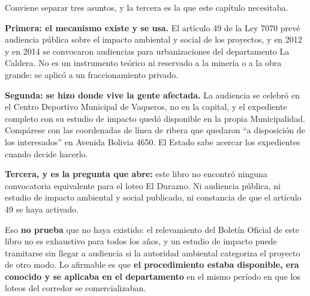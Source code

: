 \begin{cautela}
Conviene separar tres asuntos, y la tercera es la que este capítulo necesitaba.

\textbf{Primera: el mecanismo existe y se usa.} El artículo 49 de la Ley 7070 prevé audiencia pública sobre el impacto ambiental y social de los proyectos, y en 2012 y en 2014 se convocaron audiencias para urbanizaciones del departamento La Caldera. No es un instrumento teórico ni reservado a la minería o a la obra grande: se aplicó a un fraccionamiento privado.

\textbf{Segunda: se hizo donde vive la gente afectada.} La audiencia se celebró en el Centro Deportivo Municipal de Vaqueros, no en la capital, y el expediente completo con su estudio de impacto quedó disponible en la propia Municipalidad. Compárese con las coordenadas de línea de ribera que quedaron ``a disposición de los interesados'' en Avenida Bolivia 4650. El Estado sabe acercar los expedientes cuando decide hacerlo.

\textbf{Tercera, y es la pregunta que abre:} este libro no encontró ninguna convocatoria equivalente para el loteo El Durazno. Ni audiencia pública, ni estudio de impacto ambiental y social publicado, ni constancia de que el artículo 49 se haya activado.

Eso \textbf{no prueba} que no haya existido: el relevamiento del Boletín Oficial de este libro no es exhaustivo para todos los años, y un estudio de impacto puede tramitarse sin llegar a audiencia si la autoridad ambiental categoriza el proyecto de otro modo. Lo afirmable es que \textbf{el procedimiento estaba disponible, era conocido y se aplicaba en el departamento} en el mismo período en que los loteos del corredor se comercializaban.
\end{cautela}

